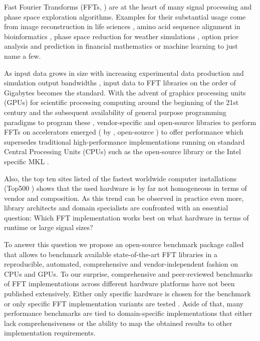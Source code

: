 Fast Fourier Transforms (FFTs, \citep{van1992computational}) are at the heart of many signal processing and phase space exploration algorithms. Examples for their substantial usage come from image reconstruction in life sciences \citep{preibisch2014efficient,schmid2015real}, amino acid sequence alignment in bioinformatics \citep{katoh2002mafft}, phase space reduction for weather simulations \citep{maronga2015parallelized}, option price analysis and prediction in financial mathematics \citep{hurd2010fourier} or machine learning \citep{dlstudy} to just name a few.

As input data grows in size with increasing experimental data production \citep{huisken2004optical} and simulation output bandwidths \citep{maronga2015parallelized}, input data to FFT libraries on the order of Gigabytes becomes the standard. With the advent of graphics processing units (GPUs) for scientific processing computing around the beginning of the 21st century and the subsequent availability of general purpose programming paradigms to program these \citep{du2012cuda}, vendor-specific and open-source libraries to perform FFTs on accelerators emerged (\cufft{} \citep{nvidia2010cufft} by \nvidia{}, open-source \clfft{} \citep{clfft}) to offer performance which supersedes traditional high-performance implementations running on standard Central Processing Units (CPUs) such as the open-source \fftw{} library \citep{FFTW05} or the Intel specific MKL \citep{intel2007intel}.

Also, the top ten sites listed of the fastest worldwide computer installations (Top500 \citep{meuer2011top500}) shows that the used hardware is by far not homogeneous in terms of vendor and composition. As this trend can be observed in practice even more, library architects and domain specialists are confronted with an essential question: Which FFT implementation works best on what hardware in terms of runtime or large signal sizes?  

To answer this question we propose an open-source benchmark package called \gearshifft{} \citep{gearshifft_github} that allows to benchmark available state-of-the-art FFT libraries in a reproducible, automated, comprehensive and vendor-independent fashion on CPUs and GPUs.
%
To our surprise, comprehensive and peer-reviewed benchmarks of FFT implementations across different hardware platforms have not been published extensively. Either only specific hardware is chosen for the benchmark \citep{park2015fast,eleftheriou2005performance,Akin:15} or only specific FFT implementation variants are tested \citep{shoc2010,dongarra2013hpc}. Aside of that, many performance benchmarks are tied to domain-specific implementations \citep{fialka2006fft} that either lack comprehensiveness or the ability to map the obtained results to other implementation requirements.

